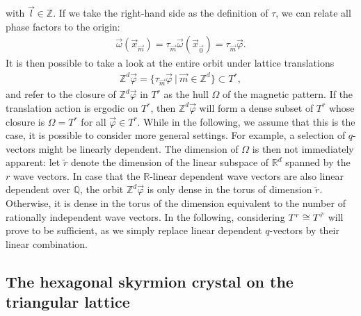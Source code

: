 \documentclass[submission, Phys]{SciPost}
\begin{document}
with $\vec{l}\in\mathbb{Z}$.
If we take the right-hand side as the definition of $\tau$, we can relate all phase factors to the origin:
\begin{align}
    \vec{\omega}(\vec{x}_{\vec{m}}) = \tau_{\vec{m}}  \vec{\omega}(\vec{x}_{\vec{0}})
    = \tau_{\vec{m}}  \vec{\varphi} .
    \label{eq:phaseorigin}
\end{align}
It is then possible to take a look at the entire orbit under lattice translations
\begin{align}
    \mathbb{Z}^d \vec{\varphi}
    = \lbrace \tau_{\vec{m}}  \vec{\varphi}  ~|~ \vec{m} \in \mathbb{Z}^d\rbrace  \subset T^r,
\end{align}
and refer to the closure of $\mathbb{Z}^d \vec{\varphi}$ in $T^r$ as the hull $\Omega$ of the magnetic pattern.
If the translation action is ergodic on $T^r$, then $\mathbb{Z}^d \vec{\varphi}$ will form a dense subset of $T^r$ whose closure is $\Omega = T^r$ for all $\vec{\varphi} \in T^r$.
While in the following, we assume that this is the case, it is possible to consider more general settings.
For example, a selection of $q$-vectors might be linearly dependent.
The dimension of $\Omega$ is then not immediately apparent: let $\tilde{r}$ denote the dimension of the linear subspace of $\mathbb{R}^d$ spanned by the $r$ wave vectors.
In case that the $\mathbb{R}$-linear dependent wave vectors are also linear dependent over $\mathbb{Q}$, the orbit $\mathbb{Z}^d \vec{\varphi}$ is only dense in the torus of dimension $\tilde{r}$.
Otherwise, it is dense in the torus of the dimension equivalent to the number of rationally independent wave vectors.
In the following, considering $T^r\cong T^{\tilde{r}}$ will prove to be sufficient, as we simply replace linear dependent $q$-vectors by their linear combination.

\subsection{The hexagonal skyrmion crystal on the triangular lattice}
\label{subsec:our_model}
\end{document}
